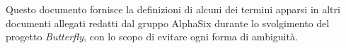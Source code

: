 Questo documento fornisce la definizioni di alcuni dei termini apparsi in altri documenti allegati redatti 
dal gruppo AlphaSix durante lo svolgimento del progetto \textit{Butterfly}, con
lo scopo di evitare ogni forma di ambiguit\`a.